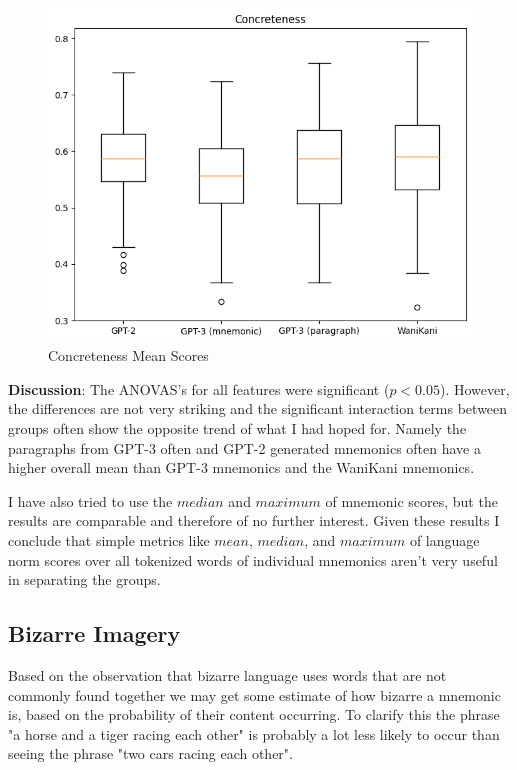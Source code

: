 \begin{figure}
    \centering
    \includegraphics[width=400pt]{resources/concr_mean_box_plot.png}
    \caption{Concreteness Mean Scores}
    \label{figure:concr_mean_box_plot}
\end{figure}
\textbf{Discussion}: The ANOVAS's for all features were significant ($p < 0.05$). However, the differences are not very striking and the significant interaction terms between groups often show the opposite trend of what I had hoped for. Namely the paragraphs from GPT-3 often and GPT-2 generated mnemonics often have a higher overall mean than GPT-3 mnemonics and the WaniKani mnemonics.

I have also tried to use the $median$ and $maximum$ of mnemonic scores, but the results are comparable and therefore of no further interest. Given these results I conclude that simple metrics like $mean$, $median$, and $maximum$ of language norm scores over all tokenized words of individual mnemonics aren't very useful in separating the groups.
\subsection{Bizarre Imagery}
Based on the observation that bizarre language uses words that are not commonly found together we may get some estimate of how bizarre a mnemonic is, based on the probability of their content occurring. To clarify this the phrase "a horse and a tiger racing each other" is probably a lot less likely to occur than seeing the phrase "two cars racing each other".

